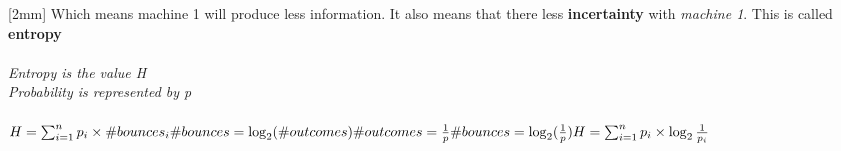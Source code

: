 \documentclass{article}
\begin{document}
    [2mm]
    Which means machine 1 will produce less information. It also means
    that there less \textbf{incertainty} with \textit{machine 1}. This is called \textbf{entropy}
    \\
    [4mm]
    \\
    \textit{Entropy is the value H}\\
    \textit{Probability is represented by p}
    \\
    [2mm]
    \\
    \begin{math}
      H=\sum_{i=1}^np_i\times\#bounces_i\\
      [4mm]
      \#bounces=\log_2(\#outcomes)\\
      \#outcomes=\frac{1}{p}\\
      \#bounces = \log_2(\frac{1}{p})\\
      [4mm]
      H=\sum_{i=1}^np_i\times\log_2\frac{1}{p_i}\\
    \end{math}
    \\
    [4mm]
\end{document}
